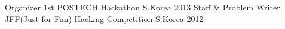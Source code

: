 \begin{cvhonors}
  \cvhonor
    {Organizer}
    {1st POSTECH Hackathon}
    {S.Korea}
    {2013}
  \cvhonor
    {Staff \& Problem Writer}
    {JFF(Just for Fun) Hacking Competition}
    {S.Korea}
    {2012}
\end{cvhonors}
